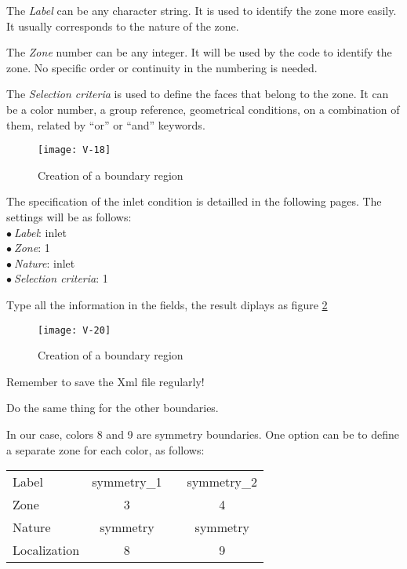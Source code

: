 The {\itshape Label} can be any character string. It is used to identify the
zone more easily. It usually corresponds to the nature of the zone.

The {\itshape Zone} number can be any integer. It will be used by the code to
identify the zone. No specific order or continuity in the numbering is needed.

The {\itshape Selection criteria} is used to define the faces that belong to the
zone. It can be a color number, a group reference, geometrical conditions, on a
combination of them, related by ``or'' or ``and'' keywords.

\begin{figure}[ht]
\begin{center}
\texttt{[image: V-18]}
\caption{Creation of a boundary region}
\label{fig21_e1}
\end{center}
\end{figure}


\clearpage
The specification of the inlet condition is detailled in the following
pages. The settings will be as follows:\\
\hspace*{1cm}$\bullet\ ${\itshape Label}: inlet\\
\hspace*{1cm}$\bullet\ ${\itshape Zone}: 1\\
\hspace*{1cm}$\bullet\ ${\itshape Nature}: inlet\\
\hspace*{1cm}$\bullet\ ${\itshape Selection criteria}: 1

Type all the information in the fields, the result diplays as figure \ref{fig20_e1}

\begin{figure}[ht]
\begin{center}
\texttt{[image: V-20]}
\caption{Creation of a boundary region}
\label{fig20_e1}
\end{center}
\end{figure}

Remember to save the Xml file regularly!


\clearpage
Do the same thing for the other boundaries.

In our case, colors 8 and 9 are symmetry boundaries. One option can be to define
a separate zone for each color, as follows:
\begin{center}
\begin{tabular}{lcp{2cm}c}
Label & symmetry\_1 & & symmetry\_2 \\
Zone & 3 & & 4 \\
Nature & symmetry & & symmetry \\
Localization & 8 & & 9 \\
\end{tabular}
\end{center}

